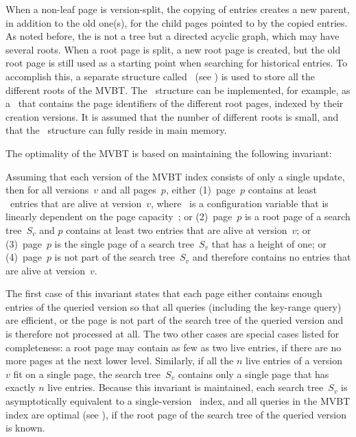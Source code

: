 When a non-leaf page is version-split, the copying of entries
creates a new parent, in addition to the old one(s), for the
child pages pointed to by the copied entries.
As noted before, the  is not a tree but a directed acyclic
graph, which may have several roots.
When a root page is split, a new root page is created, but the old root page
is still used as a starting point when searching for historical entries.
To accomplish this, a separate structure called
\rootstar\ (see ) is used to store all the different
roots of the MVBT\@. 
The \rootstar\ structure can be implemented, for example, as a
\Btree\ that contains the page identifiers of the different root pages,
indexed by their creation versions. 
It is assumed that the number of different roots is small, and that the
\rootstar\ structure can fully reside in main memory.

The optimality of the MVBT is based on maintaining the following invariant:

\thmskip
\begin{invariant}
\label{inv:mvbt-live-count}
Assuming that each version of the MVBT index consists of only a single
update, then for all versions~$v$ and all pages~$p$, either
(1)~page~$p$ contains at least \minlive\ entries that are alive at
version~$v$, where \minlive\ is a configuration variable that is linearly
dependent on the page capacity~\capacity; or 
(2)~page~$p$ is a root page of a search tree~$S_v$ and $p$ contains at least
two entries that are alive at version~$v$; or 
(3)~page~$p$ is the single page of a search tree~$S_v$ that has a height of
one; or
(4)~page~$p$ is not part of the search tree~$S_v$ and therefore
contains no entries that are alive at version~$v$.
\end{invariant}
\thmskip

The first case of this invariant states that each page either contains enough
entries of the queried version so that all queries (including the
key-range query) are efficient, or the page is not part of the search tree of
the queried version and is therefore not processed at all.
The two other cases are special cases listed for completeness: a root page may
contain as few as two live entries, if there are no more pages at the next
lower level.
Similarly, if all the $n$ live entries of a version~$v$ fit on a single page,
the search tree~$S_v$ contains only a single page that has exactly $n$ live
entries.
Because this invariant is maintained, each search tree~$S_v$ is
asymptotically equivalent to a single-version \Btree\ index, and all queries
in the MVBT index are optimal (see ), if the root
page of the search tree of the queried version is known.

